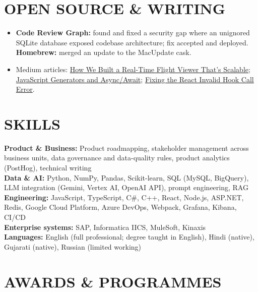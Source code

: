 \documentclass[a4paper,10pt]{extarticle}
\begin{document}
\section*{OPEN SOURCE \& WRITING}

\begin{itemize}
    \item \textbf{Code Review Graph:} found and fixed a security gap where an unignored SQLite database
    exposed codebase architecture; fix accepted and deployed. \textbf{Homebrew:} merged an update to
    the MacUpdate cask.

    \item Medium articles:
    \href{https://medium.com/@shivansh01308/how-we-built-real-time-flight-viewer-thats-scalable-c5441b2ba36b}{How We Built a Real-Time Flight Viewer That's Scalable};
    \href{https://medium.com/@shivansh01308/understanding-javascript-generators-and-async-await-a-deep-dive-c7dc1091047f}{JavaScript Generators and Async/Await};
    \href{https://medium.com/@shivansh01308/fixing-the-infamous-react-invalid-hook-call-error-a-developers-guide-cde3af4dbfb8}{Fixing the React Invalid Hook Call Error}.
\end{itemize}

\section*{SKILLS}

\textbf{Product \& Business:} Product roadmapping, stakeholder management across business units, data
governance and data-quality rules, product analytics (PostHog), technical writing\\
\textbf{Data \& AI:} Python, NumPy, Pandas, Scikit-learn, SQL (MySQL, BigQuery), LLM integration
(Gemini, Vertex AI, OpenAI API), prompt engineering, RAG\\
\textbf{Engineering:} JavaScript, TypeScript, C\#, C++, React, Node.js, ASP.NET, Redis, Google Cloud
Platform, Azure DevOps, Webpack, Grafana, Kibana, CI/CD\\
\textbf{Enterprise systems:} SAP, Informatica IICS, MuleSoft, Kinaxis\\
\textbf{Languages:} English (full professional; degree taught in English), Hindi (native), Gujarati
(native), Russian (limited working)

\section*{AWARDS \& PROGRAMMES}
\end{document}
